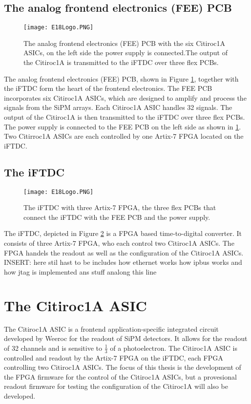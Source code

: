 \subsection{The analog frontend electronics (FEE) PCB}
\begin{figure}[H]
    \centering
    \texttt{[image: E18Logo.PNG]}
    \caption{The analog frontend electronics (FEE) PCB with the six Citiroc1A ASICs, on the left side the power supply is connected.The output of the Citiroc1A is transmitted to the iFTDC over three flex PCBs.\autocite{InternalcommunicationKarl}}
    \label{fig:FEE}
\end{figure}
The analog frontend electronics (FEE) PCB, shown in Figure \ref{fig:FEE}, together with the iFTDC form the heart of the frontend electronics.
The FEE PCB incorporates six Citiroc1A ASICs, which are designed to amplify and process the signals from the SiPM arrays.
 Each Citiroc1A ASIC handles 32 signals. The output of the Citiroc1A is then transmitted to the iFTDC over three flex PCBs.
The power supply is connected to the FEE PCB on the left side as shown in \ref{fig:FEE}. Two Citirroc1A ASICs are each controlled by one Artix-7 FPGA located on the iFTDC.\autocite{InternalcommunicationIgor}
\subsection{The iFTDC}
\begin{figure}[H]
    \centering
    \texttt{[image: E18Logo.PNG]}
    \caption{The iFTDC with three Artix-7 FPGA, the three flex PCBs that connect the iFTDC with the FEE PCB and the power supply.\autocite{InternalcommunicationIgor}}
    \label{fig:iFTDC}
\end{figure}

The iFTDC, depicted in Figure \ref{fig:iFTDC} is a FPGA based time-to-digital converter. It consists of three Artix-7 FPGA, who each control two Citiroc1A ASICs.
The FPGA handels the readout as well as the configuration of the Citiroc1A ASICs\autocite{InternalcommunicationIgor}.
\newline
INSERT: here stil hast to be includes how ethernet works how ipbus works and how jtag is implemented ans stuff analong this line 
\section{The Citiroc1A ASIC}
The Citiroc1A ASIC is a frontend application-specific integrated circuit developed by Weeroc for the readout of SiPM detectors.
It allows for the readout of 32 channels and is sensitive to $\frac{1}{3}$ of a photoelectron.\autocite{datasheetCITIROC}
\newline
The Citiroc1A ASIC is controlled and readout by the Artix-7 FPGA on the iFTDC, each FPGA controlling two Citiroc1A ASICs.\autocite{InternalcommunicationIgor}
The focus of this thesis is the development of the FPGA firmware for the control of the Citiroc1A ASICs,
 but a provesional readout firmware for testing the configuration of the Citiroc1A will also be developed.
